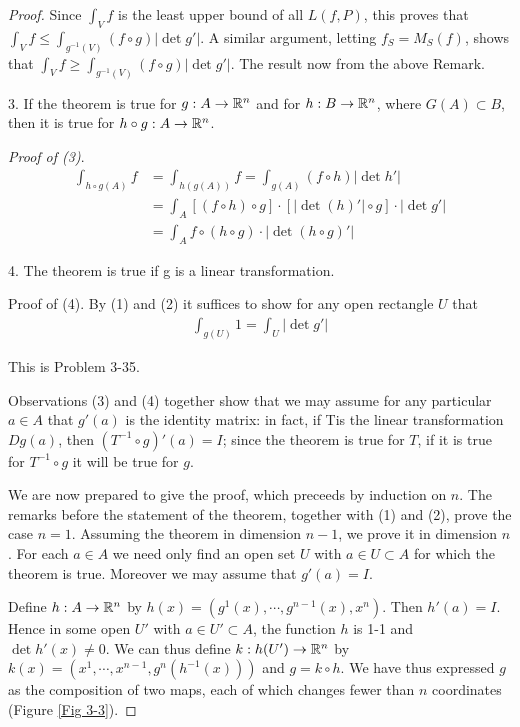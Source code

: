 \begin{proof}
Since $\int_V f$ is the least upper bound of all $L(f,P)$, this proves that 
$\int_V f \le \int_{g^{-1}(V)} (f\circ g)|\det g'|$. A similar argument, letting 
$f_S = M_S(f)$, shows that $\int_V f \ge \int_{g^{-1}(V)} (f\circ g)|\det g'|$. The result 
now from the above Remark.

3. If the theorem is true for $g:A\to \mathbb{R}^n$ and for $h:B\to \mathbb{R}^n$, where 
$G(A)\subset B$, then it is true for $h\circ g:A\to \mathbb{R}^n$.

\textit{Proof of (3)}. 
\begin{align*}
    \int_{h\circ g(A)} f 
    & = \int_{h(g(A))} f 
        = \int_{g(A)} (f\circ h)|\det h'| \\
    & = \int_A [(f\circ h)\circ g] \cdot [|\det (h)'|\circ g]\cdot |\det g'| \\
    & = \int_A f\circ (h\circ g) \cdot |\det (h\circ g)'|
\end{align*}

4. The theorem is true if g is a linear transformation.\par
Proof of (4). By (1) and (2) it suffices to show for any open
rectangle $U$ that
\begin{align*}
    \int_{g(U)} 1 = \int_U |\det g'|
\end{align*}

This is Problem 3-35.

Observations (3) and (4) together show that we may assume
for any particular $a \in A$ that $g'(a)$ is the identity matrix: in
fact, if Tis the linear transformation $Dg(a)$, then $(T^{-1}\circ g)'(a)=I$;
since the theorem is true for $T$, if it is true for $T^{-1}\circ g$ it will
be true for $g$.

We are now prepared to give the proof, which preceeds by
induction on $n$. The remarks before the statement of the
theorem, together with (1) and (2), prove the case $n = 1$.
Assuming the theorem in dimension $n-1$, we prove it in
dimension $n$. For each $a\in A$ we need only find an open set
$U$ with $a\in U \subset A$ for which the theorem is true.
Moreover we may assume that $g'(a)=I$. 

Define $h:A\to \mathbb{R}^n$ by $h(x) = (g^1(x), \cdots, g^{n-1}(x), x^n)$. Then $h'(a)=I$. Hence 
in some open $U'$ with $a\in U'\subset A$, the function $h$ is 1-1 and $\det h'(x)\neq 0$. We 
can thus define $k: h(U')\to \mathbb{R}^n$ by $k(x)=(x^1, \cdots, x^{n-1}, g^n(h^{-1}(x)))$ and 
$g=k\circ h$. We have thus expressed $g$ as the composition of two maps, each of which changes
fewer than $n$ coordinates (Figure \ref{Fig 3-3}).


\end{proof}
